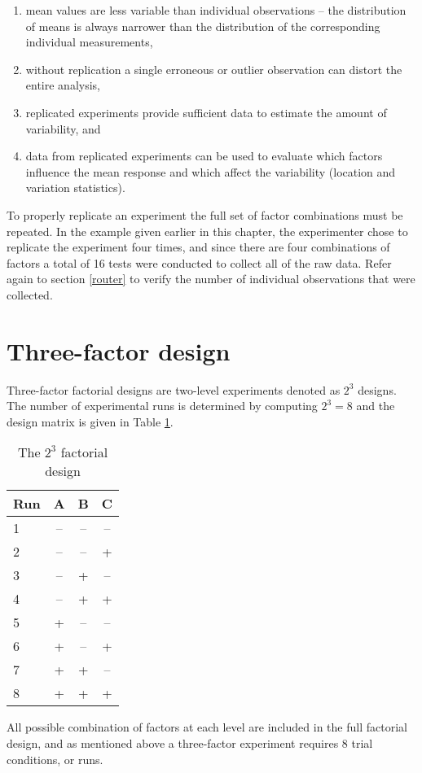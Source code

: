 \begin{enumerate}
\item mean values are less variable than individual observations -- the distribution of means is always narrower than the distribution of the corresponding individual measurements,
\item without replication a single erroneous or outlier observation can distort the entire analysis,
\item replicated experiments provide sufficient data to estimate the amount of variability, and
\item data from replicated experiments can be used to evaluate which factors influence the mean response and which affect the variability (location and variation statistics).
\end{enumerate}

To properly replicate an experiment the full set of factor combinations must be repeated.  In the example given earlier in this chapter, the experimenter chose to replicate the experiment four times, and since there are four combinations of factors a total of 16 tests were conducted to collect all of the raw data.  Refer again to section \ref{router} to verify the number of individual observations that were collected.

\section{Three-factor design}
Three-factor factorial designs are two-level experiments denoted as $ 2^{3} $ designs. The number of experimental runs is determined by computing $ 2^{3} = 8 $ and the design matrix is given in Table \ref{tab4}.
\begin{table}[h]\caption{The $2^{3}$ factorial design}\label{tab4}
\begin{center}
\begin{tabular}{|l|c|c|c|}
\hline Run & A & B & C\\ 
\hline 1 & -- & -- & --\\ 
\hline 2 & -- & -- & +\\ 
\hline 3 & -- & + & --\\ 
\hline 4 & -- & + & +\\
\hline 5 & + & -- & --\\
\hline 6 & + & -- & +\\
\hline 7 & + & + & --\\
\hline 8 & + & + & +\\ 
\hline 
\end{tabular} 
\end{center}
\end{table}
All possible combination of factors at each level are included in the full factorial design, and as mentioned above  a three-factor experiment requires 8 trial conditions, or runs.  

